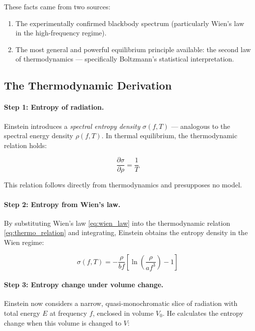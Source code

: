 These facts came from two sources:
\begin{enumerate}
    \item The experimentally confirmed blackbody spectrum (particularly Wien's law 
    in the high-frequency regime).
    \item The most general and powerful equilibrium principle available: the second 
    law of thermodynamics — specifically Boltzmann's statistical interpretation.
\end{enumerate}

\subsection{The Thermodynamic Derivation}

\paragraph{Step 1: Entropy of radiation.}
Einstein introduces a \emph{spectral entropy density} $\sigma(f, T)$ — analogous 
to the spectral energy density $\rho(f, T)$. In thermal equilibrium, the 
thermodynamic relation holds:

\begin{equation}
    \frac{\partial \sigma}{\partial \rho} = \frac{1}{T}
    \label{eq:thermo_relation}
\end{equation}

This relation follows directly from thermodynamics and presupposes no model.

\paragraph{Step 2: Entropy from Wien's law.}
By substituting Wien's law \eqref{eq:wien_law} into the thermodynamic relation 
\eqref{eq:thermo_relation} and integrating, Einstein obtains the entropy density 
in the Wien regime:

\begin{equation}
    \sigma(f, T) = -\frac{\rho}{bf} \left[\ln\!\left(\frac{\rho}{af^3}\right) - 1\right]
    \label{eq:entropy_density}
\end{equation}

\paragraph{Step 3: Entropy change under volume change.}
Einstein now considers a narrow, quasi-monochromatic slice of radiation with total 
energy $E$ at frequency $f$, enclosed in volume $V_0$. He calculates the entropy 
change when this volume is changed to $V$:

